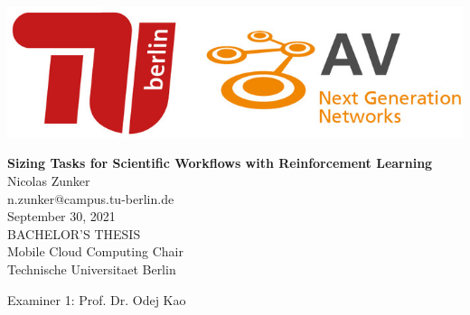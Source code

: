 
\thispagestyle{empty}

\includegraphics[width=\linewidth]{fig/Logo_Header}
\mbox{}\\[1pc]
\begin{center}
    \huge{ \bfseries Sizing Tasks for Scientific Workflows with Reinforcement Learning}\\[2pc]

    \Large{Nicolas Zunker}\\
    \large{n.zunker@campus.tu-berlin.de}\\[1pc]
    \large{September 30, 2021}\\[2pc]

    BACHELOR'S THESIS\\
    Mobile Cloud Computing Chair\\
    Technische Universitaet Berlin
\end{center}
\vfill

Examiner 1: Prof. Dr. Odej Kao
\hfill{}\\

\afterpage{\null\thispagestyle{empty}\newpage}
